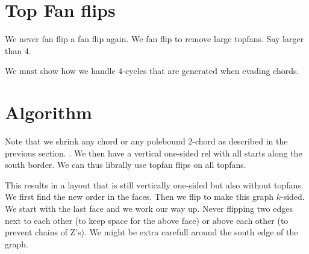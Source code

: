 
\section{Top Fan flips}

We never fan flip a fan flip again. We fan flip to remove large topfans. Say larger than 4.

We must show how we handle $4$-cycles that are generated when evading chords.


\section{Algorithm}
Note that we shrink any chord or any polebound 2-chord as described in the previous section. . We then have a vertical one-sided rel with all starts along the south border. We can thus librally use topfan flips on all topfans.

This results in a layout that is still vertically one-sided but also without topfans. We first find the new order in the faces. Then we flip to make this graph $k$-sided. We start with the last face and we work our way up. Never flipping two edges next to each other (to keep space for the above face) or above each other (to prevent chains of Z's). We might be extra carefull around the south edge of the graph.

